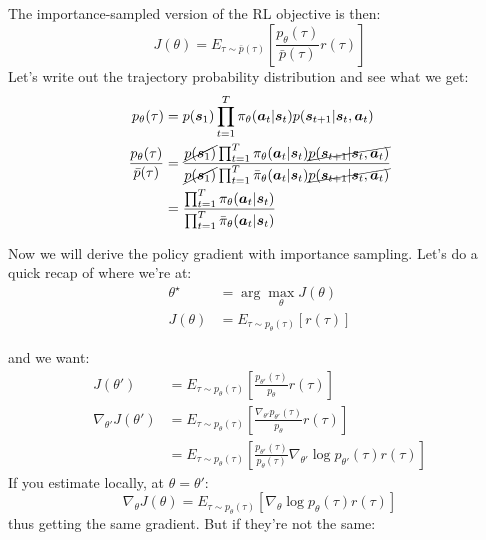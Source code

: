 \documentclass{report}
\newcommand{\argmax}{\arg\!\max}
\begin{document}
The importance-sampled version of the RL objective is then:
\begin{equation}
		J(\theta) = E_{\tau \sim \bar{p}(\tau)} \left [ \frac{p_\theta(\tau)}{\bar{p}(\tau)} r(\tau) \right ]
\end{equation}
Let's write out the trajectory probability distribution and see what we get:
\begin{align}
		p_\theta(\tau) &= p(\bm{s}_1) \prod_{t=1}^{T} \pi_\theta(\bm{a}_t | \bm{s}_t) p(\bm{s}_{t+1}|\bm{s}_t, \bm{a}_t) \\
		\frac{p_\theta(\tau)}{\bar{p}(\tau)} &=
		\frac{\cancel{p(\bm{s}_1)} \prod_{t=1}^{T} \pi_\theta(\bm{a}_t | \bm{s}_t) \cancel{p(\bm{s}_{t+1}|\bm{s}_t, \bm{a}_t)} }
		{\cancel{p(\bm{s}_1)} \prod_{t=1}^{T} \bar{\pi}_\theta(\bm{a}_t | \bm{s}_t) \cancel{p(\bm{s}_{t+1}|\bm{s}_t, \bm{a}_t)} } \\
	&= \frac{ \prod_{t=1}^{T} \pi_\theta(\bm{a}_t | \bm{s}_t)  }
		{ \prod_{t=1}^{T} \bar{\pi}_\theta(\bm{a}_t | \bm{s}_t)  }
\end{align}

Now we will derive the policy gradient with importance sampling.
Let's do a quick recap of where we're at:
\begin{align}
		\theta^\star  &= \argmax_\theta J(\theta) \\
		J(\theta) &= E_{\tau \sim p_\theta(\tau)} \left[ r(\tau) \right] 
\end{align}

and we want:
\begin{align}
		J(\theta') &= E_{\tau \sim p_\theta(\tau)} \left[ \frac{p_{\theta'}(\tau)}{p_\theta} r(\tau)  \right] \\
		\nabla_{\theta'}	J(\theta') &= E_{\tau \sim p_\theta(\tau)} \left[ \frac{\nabla_{\theta'} p_{\theta'}(\tau)}{p_\theta} r(\tau)  \right] \\
	   &= E_{\tau \sim p_\theta(\tau)} \left[  \frac{p_{\theta'}(\tau)}{p_\theta(\tau)} \nabla_{\theta'} \log p_{\theta'}(\tau)r(\tau) \right] 
\end{align}
If you estimate locally, at $\theta = \theta'$: 
\begin{equation}
\nabla_\theta J(\theta)  = E_{\tau \sim p_\theta(\tau)} \left[ \nabla_\theta \log p_\theta(\tau)r(\tau) \right] 
\end{equation}
thus getting the same gradient.
But if they're not the same:
\end{document}
